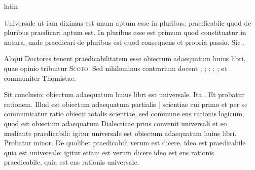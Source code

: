 \begin{otherlanguage*}{latin}
\pstart
{}
\pend

\pstart
Universale ut iam diximus est unum aptum esse in pluribus; praedicabile quod de pluribus praedicari aptum est. In pluribus esse est primum quod constituatur in natura, unde praedicari de pluribus est quod consequens et propria passio. Sic . 
\pend

\pstart
Aliqui Doctores tenent praedicabilitatem esse obiectum adaequatum huius libri, quae opinio tribuitur \textsc{Scoto}. Sed nihilominus contrarium docent ; ; ; ; ;  et communiter Thomistae. 
\pend

\pstart
Sit conclusio:
obiectum adaequatum huius libri est universale. Ita . Et probatur rationem. Illud est obiectum adaequatum partialis \textnormal{|} scientiae cui primo et per se communicatur ratio obiecti totalis scientiae, sed commune ens rationis logicum, quod est obiectum adaequatum Dialecticae prius convenit universali et eo mediante praedicabili:
igitur universale est obiectum adaequatum huius libri. Probatur minor. De quolibet praedicabili verum est dicere, ideo est praedicabile quia est universale:
igitur etiam est verum dicere ideo est ens rationis praedicabile, quia est ens rationis universale. 
\pend


\end{otherlanguage*}
